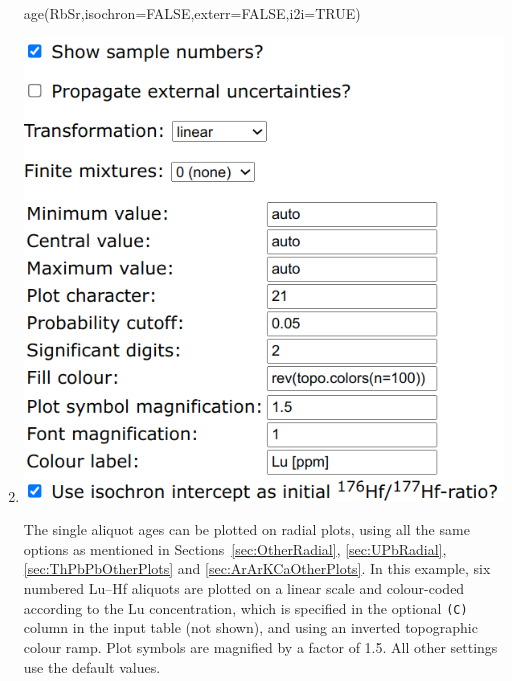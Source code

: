 \begin{refsection}
\begin{enumerate}
\begin{console}
age(RbSr,isochron=FALSE,exterr=FALSE,i2i=TRUE)
\end{console}

\item\noindent\begin{minipage}[t]{.55\linewidth}
\strut\vspace*{-\baselineskip}\newline
\includegraphics[width=\linewidth]{../figures/LuHfRadial.png}
\end{minipage}
\begin{minipage}[t]{.45\linewidth}
  The single aliquot ages can be plotted on radial plots, using all
  the same options as mentioned in Sections~\ref{sec:OtherRadial},
  \ref{sec:UPbRadial}, \ref{sec:ThPbPbOtherPlots} and
  \ref{sec:ArArKCaOtherPlots}. In this example, six numbered Lu--Hf
  aliquots are plotted on a linear scale and colour-coded according to
  the Lu concentration, which is specified in the optional
  \texttt{(C)} column in the input table (not shown), and using an
  inverted topographic colour ramp.  Plot symbols are magnified by a
  factor of 1.5. All other settings use the default values.
\end{minipage}



\end{enumerate}
\end{refsection}
